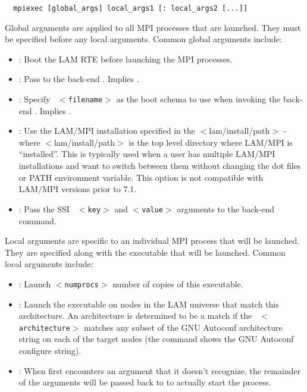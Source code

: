 \lstset{style=lam-cmdline}
\begin{lstlisting}
  mpiexec [global_args] local_args1 [: local_args2 [...]]
\end{lstlisting}

Global arguments are applied to all MPI processes that are launched.
They must be specified before any local arguments.  Common global
arguments include:

\begin{itemize}
\item {}: Boot the LAM RTE before launching the MPI
  processes.

\item {}: Pass  to the
  back-end .  Implies .

\item {}: Specify {\tt
    $<$filename$>$} as the boot schema to use when invoking the
    back-end .  Implies .

\item {}: Use the LAM/MPI
  installation specified in the $<$lam/install/path$>$ - where
  $<$lam/install/path$>$ is the top level directory where LAM/MPI is
  ``installed''. This is typically used when a user has multiple
  LAM/MPI installations and want to switch between them without
  changing the dot files or PATH environment variable.  This option is
  not compatible with LAM/MPI versions prior to 7.1.

\item {}: Pass the SSI {\tt
    $<$key$>$} and {\tt $<$value$>$} arguments to the back-end
     command.
\end{itemize}

Local arguments are specific to an individual MPI process that will be
launched.  They are specified along with the executable that will be
launched.  Common local arguments include:

\begin{itemize}
\item {}: Launch {\tt $<$numprocs$>$} number
  of copies of this executable.
  
\item {}: Launch the executable on
  nodes in the LAM universe that match this architecture.  An
  architecture is determined to be a match if the {\tt
    $<$architecture$>$} matches any subset of the GNU Autoconf
  architecture string on each of the target nodes (the 
  command shows the GNU Autoconf configure string).
  
\item {}: When  first
  encounters an argument that it doesn't recognize, the remainder of
  the arguments will be passed back to  to actually start
  the process.
\end{itemize}

